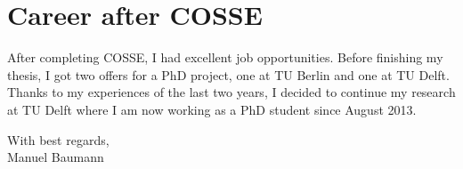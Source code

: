\documentclass{article}
\begin{document}
\section*{Career after COSSE}
After completing COSSE, I had excellent job opportunities. Before finishing my thesis, I got two offers for a PhD project, one at TU Berlin and one at TU Delft. Thanks to my experiences of the last two years, I decided to continue my research at TU Delft where I am now working as a PhD student since August 2013.
 
\vspace{0.7cm} With  best regards,\\

\vspace{0.9cm}
Manuel Baumann
\end{document}

